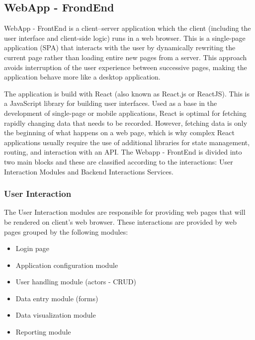 \subsection{WebApp - FrondEnd}\label{sec:WebAppFrondEnd}
WebApp - FrontEnd is a client–server application which the client (including the user interface and client-side logic) runs in a web browser. This is a single-page application (SPA) that interacts with the user by dynamically rewriting the current page rather than loading entire new pages from a server. This approach avoids interruption of the user experience between successive pages, making the application behave more like a desktop application.

The application is build with React (also known as React.js or ReactJS). This is a JavaScript library for building user interfaces. Used as a base in the development of single-page or mobile applications, React is optimal for fetching rapidly changing data that needs to be recorded. However, fetching data is only the beginning of what happens on a web page, which is why complex React applications usually require the use of additional libraries for state management, routing, and interaction with an API. The Webapp - FrontEnd is divided into two main blocks and these are classified according to the interactions: User Interaction Modules and Backend Interactions Services.

\subsubsection{User Interaction}\label{sec:UserInteraction}
The User Interaction modules are responsible for providing web pages that will be rendered on client’s web browser. These interactions are provided by web pages grouped by the following modules:

\begin{itemize}
\item Login page
\item Application configuration module
\item User handling module (actors - CRUD)
\item Data entry module (forms)
\item Data visualization module
\item Reporting module
\end{itemize}

